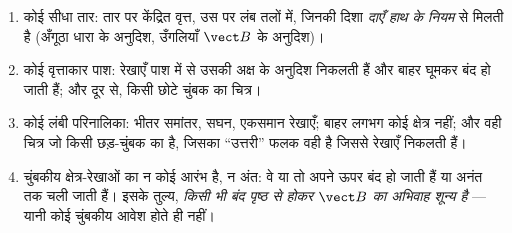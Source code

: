 \begin{proposition}[क्षेत्र-चित्र]\label{prop:b1:magnetostatics:maps}
\begin{enumerate}
  \item कोई सीधा तार: तार पर केंद्रित वृत्त, उस पर लंब तलों में, जिनकी
        दिशा \emph{दाएँ हाथ के नियम} से मिलती है
        (अँगूठा धारा के अनुदिश, उँगलियाँ $\vect B$ के अनुदिश)।
  \item कोई वृत्ताकार पाश: रेखाएँ पाश में से उसकी अक्ष के अनुदिश निकलती
        हैं और बाहर घूमकर बंद हो जाती हैं; और दूर से, किसी छोटे चुंबक का
        चित्र।
  \item कोई लंबी परिनालिका: भीतर समांतर, सघन, एकसमान रेखाएँ; बाहर लगभग कोई
        क्षेत्र नहीं; और वही चित्र जो किसी छड़-चुंबक का है, जिसका
        ``उत्तरी'' फलक वही है जिससे रेखाएँ निकलती हैं।
  \item चुंबकीय क्षेत्र-रेखाओं का न कोई आरंभ है, न अंत: वे या तो अपने ऊपर
        बंद हो जाती हैं या अनंत तक चली जाती हैं। इसके तुल्य,
        \emph{किसी भी बंद पृष्ठ से होकर $\vect B$ का अभिवाह शून्य है} ---
        यानी कोई चुंबकीय आवेश होते ही नहीं।
\end{enumerate}
\end{proposition}
\admitted


